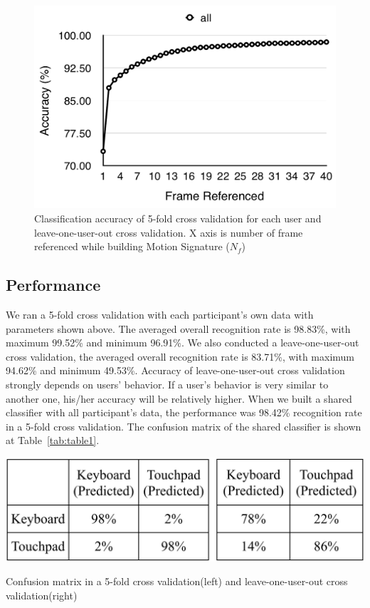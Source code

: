 \begin{figure}[!ht]
\centering
\includegraphics[width=1\columnwidth]{figures/figure3.png}
\caption{Classification accuracy of 5-fold cross validation for each user and leave-one-user-out cross validation. X axis is number of frame referenced while building Motion Signature ($N_{f}$) }
\label{fig:figure3}
\end{figure}


\subsection{Performance}
We ran a 5-fold cross validation with each participant's own data with parameters shown above. The averaged overall recognition rate is 98.83\%, with maximum 99.52\% and minimum 96.91\%.
We also conducted a leave-one-user-out cross validation, the averaged overall recognition rate is 83.71\%, with maximum 94.62\% and minimum 49.53\%.
Accuracy of leave-one-user-out cross validation strongly depends on users' behavior. If a user's behavior is very similar to another one, his/her accuracy will be relatively higher.
When we built a shared classifier with all participant's data, the performance was 98.42\% recognition rate in a 5-fold cross validation.
The confusion matrix of the shared classifier is shown at Table~\ref{tab:table1}.

\begin{table}
  \centering
\includegraphics[width=1\columnwidth]{figures/confusion.jpg}
  \caption{Confusion matrix in a 5-fold cross validation(left) and leave-one-user-out cross validation(right)}
  \label{tab:table1}
\end{table}